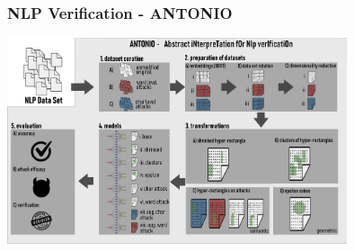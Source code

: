 \documentclass[t,compress,aspectratio=169]{beamer}
\begin{document}

\begin{frame}
\frametitle{NLP Verification - ANTONIO}

\centering \includegraphics[width=0.75\textwidth]{img/ANTONIO-flow.pdf}

\end{frame}
\end{document}
